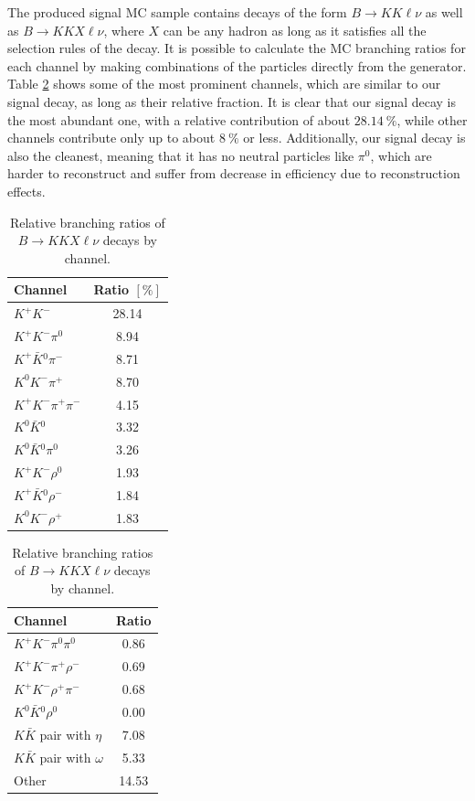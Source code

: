 \documentclass[headings=standardclasses,headings=big,oneside,a4paper,openany,12pt]{scrbook}
\begin{document}
The produced signal MC sample contains decays of the form $B \to KK\ell \nu$ as well as $B \to KKX\ell \nu$, where $X$ can be any hadron as long as it satisfies all the selection rules of the decay. It is possible to calculate the MC branching ratios for each channel by making combinations of the particles directly from the generator. Table \ref{tab:KKX} shows some of the most prominent channels, which are similar to our signal decay, as long as their relative fraction. It is clear that our signal decay is the most abundant one, with a relative contribution of about $28.14~\%$, while other channels contribute only up to about $8~\%$ or less. Additionally, our signal decay is also the cleanest, meaning that it has no neutral particles like $\pi^0$, which are harder to reconstruct and suffer from decrease in efficiency due to reconstruction effects.
\begin{table}[H]
\centering
\begin{tabular}{|l|c|}
\hline
Channel & Ratio $[\%]$ \\
\hline 
$K^+ K^-$ & 28.14 \\
\hline
$K^+ K^- \pi^0$ & 8.94 \\
\hline
$K^+ \bar{K}{}^0 \pi^-$ & 8.71 \\
\hline
$K^0 K^- \pi^+$ & 8.70 \\
\hline
$K^+ K^- \pi^+ \pi^-$ & 4.15 \\
\hline
$K^0 \bar K {}^0$ & 3.32 \\
\hline
$K^0 \bar K {}^0 \pi^0$ & 3.26 \\
\hline
$K^+ K^- \rho^0$ & 1.93 \\
\hline
$K^+ \bar{K}{}^0 \rho^-$ & 1.84 \\
\hline
$K^0 K^- \rho^+$ & 1.83 \\
\hline
\end{tabular}
\begin{tabular}{|l|c|}
\hline
Channel & Ratio \\
\hline 
$K^+ K^- \pi^0 \pi^0$ & 0.86 \\
\hline
$K^+ K^- \pi^+ \rho^-$ & 0.69 \\
\hline
$K^+ K^- \rho^+ \pi^-$ & 0.68 \\
\hline
$K^0 \bar K {}^0 \rho^0$ & 0.00 \\
\hline
\hline
$K \bar K$ pair with $\eta$ & 7.08 \\
\hline
$K \bar K$ pair with $\omega$ & 5.33 \\
\hline
Other & 14.53 \\
\hline
\end{tabular}
\caption{Relative branching ratios of $B \to KKX\ell \nu$ decays by channel.}
\label{tab:KKX}
\end{table}
\end{document}
